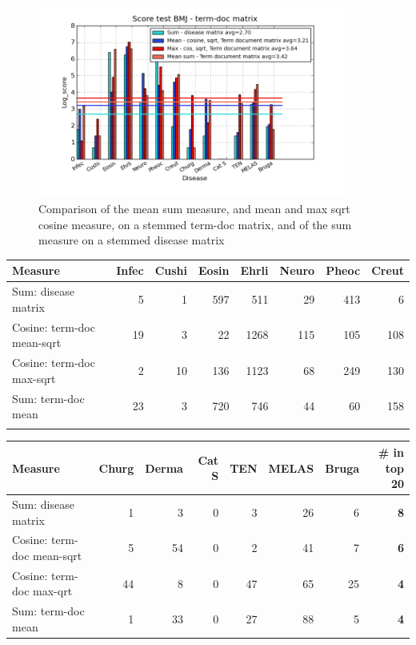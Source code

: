 \begin{figure}[H]
        \begin{center}
          \includegraphics[width=0.9\textwidth]{barcharts/termDoc_bmj_hist_3000_sum_dm_mea_cos_sqrt_td_max_cos_sqrt_td_mea_sum_td.png}
        \end{center}
        \caption{Comparison of the mean sum measure, and mean and max sqrt cosine measure, on a stemmed term-doc matrix, and of the sum measure on a stemmed disease matrix}
        \label{termDoc_bmj_hist_3000_sum_dm_mea_cos_sqrt_td_max_cos_sqrt_td_mea_sum_td}
\end{figure}

\begin{table}[H]
  \begin{tiny}
  \label{testResult}
  \begin{tabular}{|l|r|r|r|r|r|r|r|}
    \hline
    Measure &Infec&Cushi&Eosin&Ehrli&Neuro&Pheoc&Creut \\
    \hline
    Sum: disease matrix &5&1&597&511&29&413&6 \\
    \hline
    Cosine: term-doc mean-sqrt &19&3&22&1268&115&105&108 \\
    \hline
    Cosine: term-doc max-sqrt &2&10&136&1123&68&249&130 \\
    \hline
    Sum: term-doc mean &23&3&720&746&44&60&158 \\
    \hline
  \multicolumn{8}{c}{} \\
  \end{tabular}
  \begin{tabular}{|l|r|r|r|r|r|r|r|}
    \hline
    Measure &Churg&Derma&Cat S&TEN&MELAS&Bruga& \scriptsize{\textbf{\# in top 20}} \\
    \hline
    Sum: disease matrix &1&3&0&3&26&6 &\scriptsize{\textbf{8}} \\
    \hline
    Cosine: term-doc mean-sqrt &5&54&0&2&41&7 &\scriptsize{\textbf{6}}\\
    \hline
    Cosine: term-doc max-qrt &44&8&0&47&65&25 & \scriptsize{\textbf{4}} \\
    \hline
    Sum: term-doc mean &1&33&0&27&88&5 & \scriptsize{\textbf{4}} \\
    \hline
  \end{tabular}
  \end{tiny}
\end{table}

